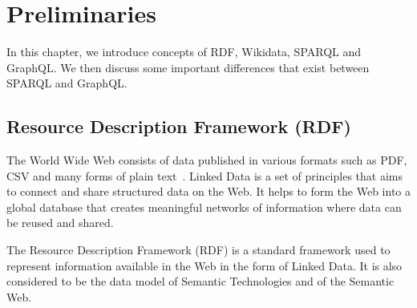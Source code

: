 \chapter{Preliminaries}
\label{ch:2}

In this chapter, we introduce concepts of RDF, Wikidata, SPARQL and GraphQL. We then discuss some important differences that exist between SPARQL and GraphQL.
\section{Resource Description Framework (RDF)}
The World Wide Web consists of data published in various formats such as PDF, CSV and many forms of plain text~\cite{Ruth2013}. Linked Data is a set of principles that aims to connect and share structured data on the Web. It helps to form the Web into a global database that creates meaningful networks of information where data can be reused and shared. 

The Resource Description Framework (RDF) is a standard framework used to represent information available in the Web in the form of Linked Data. It is also considered to be the data model of Semantic Technologies and of the Semantic Web.

